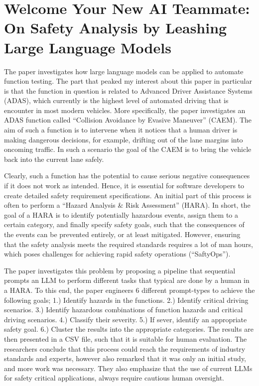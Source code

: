 \documentclass[a4paper,11pt]{article}
\begin{document}
\section{Welcome Your New AI Teammate:
On Safety Analysis by Leashing Large Language
Models
}
The paper \cite{nouri2024welcome} investigates how large language models can be applied to automate function testing. The part that peaked my interest about this paper in particular is that the function in question is related to Advanced Driver Assistance Systems (ADAS), which currently is the highest level of automated driving that is encounter in most modern vehicles. More specifically, the paper investigates an ADAS function called ``Collision Avoidance by Evasive Maneuver'' (CAEM). The aim of such a function is to intervene when it notices that a human driver is making dangerous decisions, for example, drifting out of the lane margins into oncoming traffic. In such a scenario the goal of the CAEM is to bring the vehicle back into the current lane safely.

Clearly, such a function has the potential to cause serious negative consequences if it does not work as intended. Hence, it is essential for software developers to create detailed safety requirement specifications.
An initial part of this process is often to perform a ``Hazard Analysis \& Risk Assessment'' (HARA). In short, the goal of a HARA is to identify potentially hazardous events, assign them to a certain category, and finally specify safety goals, such that the consequences of the events can be prevented entirely, or at least mitigated. However, ensuring that the safety analysis meets the required standards requires a lot of man hours, which poses challenges for achieving rapid safety operations (``SaftyOps'').

The paper investigates this problem by proposing a pipeline that sequential prompts an LLM to perform different tasks that typical are done by a human in a HARA. To this end, the paper engineers 6 different prompt-types to achieve the following goals; 1.) Identify hazards in the functions. 2.) Identify critical driving scenarios. 3.) Identify hazardous combinations of function hazards and critical driving scenarios. 4.) Classify their severity. 5.) If sever, identify an appropriate safety goal. 6.) Cluster the results into the appropriate categories. The results are then presented in a CSV file, such that it is suitable for human evaluation. The researchers conclude that this process could reach the requirements of industry standards and experts, however also remarked that it was only an initial study, and more work was necessary. They also emphasize that the use of current LLMs for safety critical applications, always require cautious human oversight.
\end{document}
